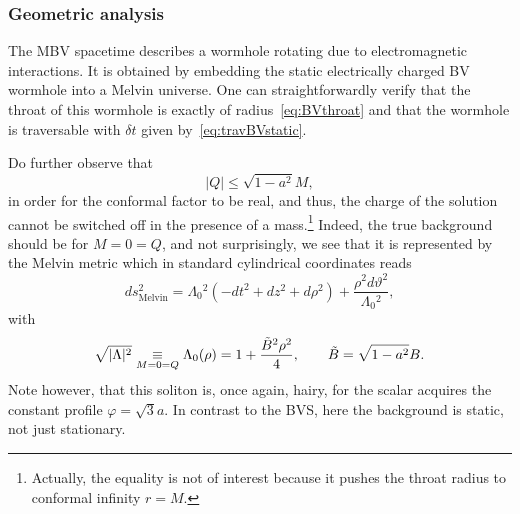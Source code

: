 \documentclass[aps,preprint,groupedaddress,nofootinbib,superscriptaddress,showkeys,showpacs,eqsecnum,amsmath,amssymb]{revtex4-1}
\begin{document}
\subsubsection{Geometric analysis}
The MBV spacetime describes a wormhole rotating due to electromagnetic interactions. It is obtained by embedding the static electrically charged BV wormhole into a Melvin universe. One can straightforwardly verify that the throat of this wormhole is exactly of radius~\eqref{eq:BVthroat} and that the wormhole is traversable with $\delta t$ given by~\eqref{eq:travBVstatic}.

Do further observe that 
\begin{equation}
    {|Q|}\leq \sqrt{1-a^2}M,
\end{equation}
in order for the conformal factor to be real, and thus, the charge of the solution cannot be switched off in the presence of a mass.\footnote{Actually, the equality is not of interest because it pushes the throat radius to conformal infinity $r=M$.} Indeed, the true background should be for $M=0=Q$, and not surprisingly, we see that it is represented by the Melvin metric \cite{Ernst:1976mzr} which in standard cylindrical coordinates reads
\begin{equation}
    ds_{\mathrm{Melvin}}^2 = \Lambda_0{}^2 \left(-dt^2 + dz^2 +d\rho^2\right) + \frac{\rho^2 d\vartheta^2}{\Lambda_0{}^2},
\end{equation}
with 
\begin{equation}
    \sqrt{|\Lambda|^2}\underset{M=0=Q}{\equiv}\Lambda_0(\rho)=1+\frac{\Tilde{B}^2 \rho^2}{4},\qquad \Tilde{B} = \sqrt{1-a^2}B. 
\end{equation}
Note however, that this soliton is, once again, hairy, for the scalar acquires the constant profile $\varphi=\sqrt{3}a$. In contrast to the BVS, here the background is static, not just stationary.
\end{document}
